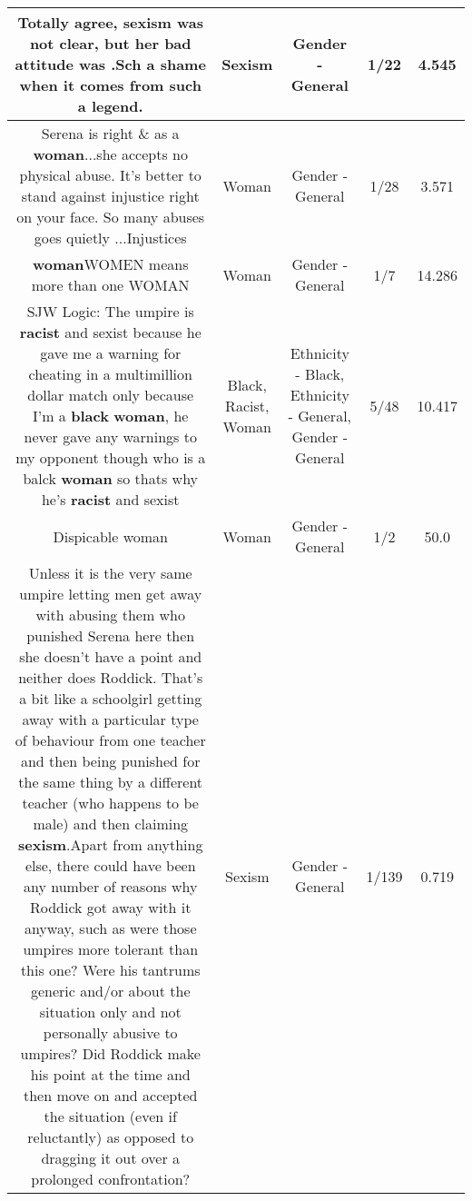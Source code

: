 \documentclass[11pt]{article}
\newlength\mylength
\begin{document}
\begin{center}
\begin{longtable}{|C{.65\mylength}|C{.30\mylength}|C{.12\mylength}|C{.12\mylength}|C{.12\mylength}|}
  \small Totally agree, \textbf{sexism} was not clear, but her bad attitude was .Sch a shame when it comes from such a legend.\normalsize   & Sexism & Gender - General & 1/22 & 4.545 \\  \hline
  \small Serena is right \& as a \textbf{woman}...she accepts no physical abuse.  It's  better to stand against injustice right on your face. So many abuses goes quietly ...Injustices\normalsize   & Woman & Gender - General & 1/28 & 3.571 \\  \hline
  \small *\textbf{woman}WOMEN means more than one WOMAN\normalsize   & Woman & Gender - General & 1/7 & 14.286 \\  \hline
  \small SJW Logic: The umpire is \textbf{racist} and sexist because he gave me a warning for cheating in a multimillion dollar match only because I'm a \textbf{black} \textbf{woman}, he never gave any warnings to my opponent though who is a balck \textbf{woman} so thats why he's \textbf{racist} and sexist\normalsize   & Black, Racist, Woman & Ethnicity - Black, Ethnicity - General, Gender - General & 5/48 & 10.417 \\  \hline
  \small Dispicable woman\normalsize   & Woman & Gender - General & 1/2 & 50.0 \\  \hline
  \small Unless it is the very same umpire letting men get away with abusing them who punished Serena here then she doesn't have a point and neither does Roddick. That's a bit like a schoolgirl getting away with a particular type of behaviour from one teacher and then being punished for the same thing by a different teacher (who happens to be male) and then claiming \textbf{sexism}.Apart from anything else, there could have been any number of reasons why Roddick got away with it anyway, such as were those umpires more tolerant than this one? Were his tantrums generic and/or about the situation only and not personally abusive to umpires?  Did Roddick make his point at the time and then move on and accepted the situation (even if reluctantly) as opposed to dragging it out over a prolonged confrontation?\normalsize   & Sexism & Gender - General & 1/139 & 0.719 \\  \hline

\end{longtable}
\end{center}
\end{document}
